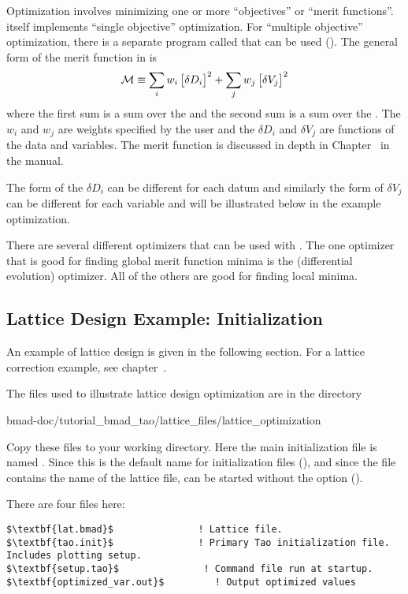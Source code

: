 \documentclass{hitec}     %
\begin{document}
Optimization involves minimizing one or more ``objectives'' or ``merit functions''. \tao itself
implements ``single objective'' optimization. For ``multiple objective'' optimization, there is a
separate program called  that can be used (). The general form of the
merit function  in \tao is
\begin{equation}
  {\cal M} \equiv 
    \sum_{i} w_i \, \bigl[ \delta D_i \bigr]^2 + 
    \sum_{j} w_j \, \bigl[ \delta V_j \bigr]^2
  \label{m1}
\end{equation}
where the first sum is a sum over the  and the second sum is a sum over the
. The $w_i$ and $w_j$ are weights specified by the user and the $\delta D_i$ and
$\delta V_j$ are functions of the data and variables. The merit function is discussed in depth in
Chapter~ in the \tao manual.

The form of the $\delta D_i$ can be different for each datum and similarly the form of $\delta V_j$
can be different for each variable and will be illustrated below in the example optimization.

There are several different optimizers that can be used with \tao. The one optimizer that is good
for finding global merit function minima is the  (differential evolution) optimizer. All of
the others are good for finding local minima.

\subsection{Lattice Design Example: Initialization}
\label{s:opt.files}

An example of lattice design is given in the following section. For a lattice correction example, see 
chapter~.

The files used to illustrate lattice design optimization are in the directory 
\begin{code}
bmad-doc/tutorial_bmad_tao/lattice_files/lattice_optimization
\end{code}
Copy these files to your working directory. Here the main initialization file is named
. Since this is the default name for initialization files (), and
since the  file contains the name of the lattice file, \tao can be started without the
 option ().

There are four files here:
\begin{lstlisting}[mathescape]
$\textbf{lat.bmad}$               ! Lattice file.
$\textbf{tao.init}$               ! Primary Tao initialization file. Includes plotting setup.
$\textbf{setup.tao}$               ! Command file run at startup.
$\textbf{optimized_var.out}$         ! Output optimized values
\end{lstlisting}
\end{document}
